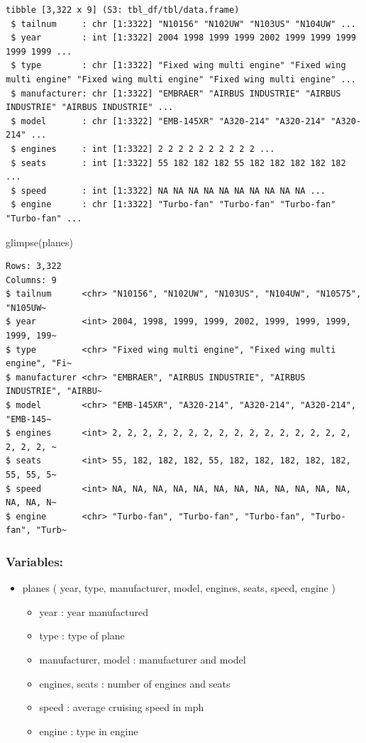 \documentclass[
  10pt,
  letterpaper,
  DIV=11,
  numbers=noendperiod]{scrartcl}
\newenvironment{Shaded}{\begin{snugshade}}{\end{snugshade}}
\newcommand{\FunctionTok}[1]{\textcolor[rgb]{0.28,0.35,0.67}{#1}}
\newcommand{\NormalTok}[1]{\textcolor[rgb]{0.00,0.23,0.31}{#1}}
\providecommand{\tightlist}{%
  \setlength{\itemsep}{0pt}\setlength{\parskip}{0pt}}\usepackage{longtable,booktabs,array}
\begin{document}
\begin{verbatim}
tibble [3,322 x 9] (S3: tbl_df/tbl/data.frame)
 $ tailnum     : chr [1:3322] "N10156" "N102UW" "N103US" "N104UW" ...
 $ year        : int [1:3322] 2004 1998 1999 1999 2002 1999 1999 1999 1999 1999 ...
 $ type        : chr [1:3322] "Fixed wing multi engine" "Fixed wing multi engine" "Fixed wing multi engine" "Fixed wing multi engine" ...
 $ manufacturer: chr [1:3322] "EMBRAER" "AIRBUS INDUSTRIE" "AIRBUS INDUSTRIE" "AIRBUS INDUSTRIE" ...
 $ model       : chr [1:3322] "EMB-145XR" "A320-214" "A320-214" "A320-214" ...
 $ engines     : int [1:3322] 2 2 2 2 2 2 2 2 2 2 ...
 $ seats       : int [1:3322] 55 182 182 182 55 182 182 182 182 182 ...
 $ speed       : int [1:3322] NA NA NA NA NA NA NA NA NA NA ...
 $ engine      : chr [1:3322] "Turbo-fan" "Turbo-fan" "Turbo-fan" "Turbo-fan" ...
\end{verbatim}

\begin{Shaded}
\begin{Highlighting}[numbers=left,,]
\FunctionTok{glimpse}\NormalTok{(planes)}
\end{Highlighting}
\end{Shaded}

\begin{verbatim}
Rows: 3,322
Columns: 9
$ tailnum      <chr> "N10156", "N102UW", "N103US", "N104UW", "N10575", "N105UW~
$ year         <int> 2004, 1998, 1999, 1999, 2002, 1999, 1999, 1999, 1999, 199~
$ type         <chr> "Fixed wing multi engine", "Fixed wing multi engine", "Fi~
$ manufacturer <chr> "EMBRAER", "AIRBUS INDUSTRIE", "AIRBUS INDUSTRIE", "AIRBU~
$ model        <chr> "EMB-145XR", "A320-214", "A320-214", "A320-214", "EMB-145~
$ engines      <int> 2, 2, 2, 2, 2, 2, 2, 2, 2, 2, 2, 2, 2, 2, 2, 2, 2, 2, 2, ~
$ seats        <int> 55, 182, 182, 182, 55, 182, 182, 182, 182, 182, 55, 55, 5~
$ speed        <int> NA, NA, NA, NA, NA, NA, NA, NA, NA, NA, NA, NA, NA, NA, N~
$ engine       <chr> "Turbo-fan", "Turbo-fan", "Turbo-fan", "Turbo-fan", "Turb~
\end{verbatim}

\subsubsection{Variables:}\label{variables-3}

\begin{itemize}
\tightlist
\item
  planes ( year, type, manufacturer, model, engines, seats, speed,
  engine )

  \begin{itemize}
  \tightlist
  \item
    year : year manufactured
  \item
    type : type of plane
  \item
    manufacturer, model : manufacturer and model
  \item
    engines, seats : number of engines and seats
  \item
    speed : average cruising speed in mph
  \item
    engine : type in engine
  \end{itemize}
\end{itemize}
\end{document}
